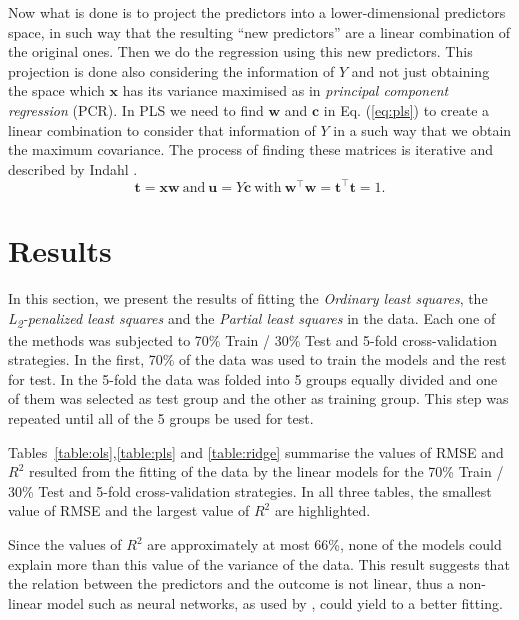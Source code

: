 \documentclass[conference]{IEEEtran}
\begin{document}
Now what is done is to project the predictors into a lower-dimensional predictors space, in such way that the resulting ``new predictors'' are a linear combination of the original ones. Then we do the regression using this new predictors. This projection is done also considering the information of $Y$ and not just obtaining the space which $\mathbf{x}$ has its variance maximised as in \emph{principal component regression} (PCR). In PLS we need to find $\mathbf{w}$ and $\mathbf{c}$ in Eq. (\ref{eq:pls}) to create a linear combination to consider that information of $Y$ in a such way that we obtain the maximum covariance. The process of finding these matrices is iterative and described by Indahl \cite{b8}.
%
\begin{equation}
\mathbf{t} = \mathbf{x}\mathbf{w}\ \text{and}\ \mathbf{u}=Y\mathbf{c}\ \text{with}\ \textbf{w}^\top\textbf{w}=\textbf{t}^\top\textbf{t}=1.
\label{eq:pls}
\end{equation}

\section{Results} \label{sec:results}

In this section, we present the results of fitting the \emph{Ordinary least squares}, the \emph{L\textsubscript{2}-penalized least squares} and the \emph{Partial least squares} in the data. Each one of the methods was subjected to 70\% Train / 30\% Test and 5-fold cross-validation strategies. In the first, 70\% of the data was used to train the models and the rest for test. In the 5-fold the data was folded into 5 groups equally divided and one of them was selected as test group and the other as training group. This step was repeated until all of the 5 groups be used for test.
%
 
%


Tables~\ref{table:ols},\ref{table:pls} and \ref{table:ridge} summarise the values of RMSE and $R^2$ resulted from the fitting of the data by the linear models for the 70\% Train / 30\% Test and 5-fold cross-validation strategies. In all three tables, the smallest value of RMSE and the largest value of $R^2$ are highlighted.

Since the values of $R^2$ are approximately at most 66\%, none of the models could explain more than this value of the variance of the data. This result suggests that the relation between the predictors and the outcome is not linear, thus a non-linear model such as neural networks, as used by \cite{b4}, could yield to a better fitting. 
\end{document}
